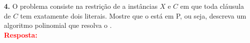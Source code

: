 
\noindent\textbf{4.} O problema  consiste na restrição de  a instâncias $X$ e $C$ em que toda cláusula de $C$ tem exatamente dois literais. Mostre que o  está em P, ou seja, descreva um algoritmo polinomial que resolva o .\\[6pt]
\textcolor{red}{\textbf{Resposta:}}
